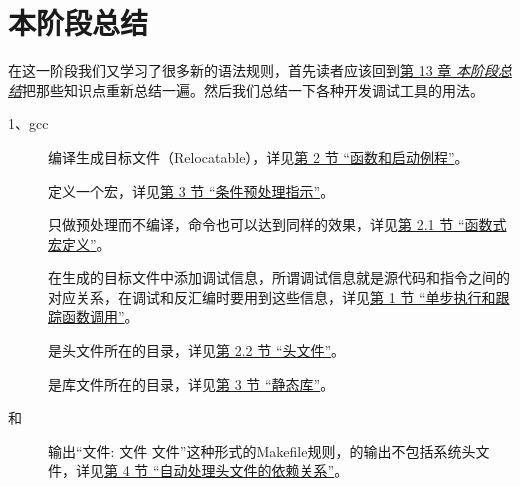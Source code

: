 

\chapter{本阶段总结}
%
在这一阶段我们又学习了很多新的语法规则，首先读者应该回到\hyperlink{db.ch13.id2752091}{第 13 章 \emph{本阶段总结}}把那些知识点重新总结一遍。然后我们总结一下各种开发调试工具的用法。



1、gcc


\begin{description}
\item[{}]


编译生成目标文件（Relocatable），详见\hyperlink{db.ch19s02.id2776173}{第 2 节 “函数和启动例程”}。

\item[{}]


定义一个宏，详见\hyperlink{db.ch21s03.id2798658}{第 3 节 “条件预处理指示”}。

\item[{}]


只做预处理而不编译，命令也可以达到同样的效果，详见\hyperlink{db.ch21s02.id2797214}{第 2.\BookSplit{}1 节 “函数式宏定义”}。

\item[{}]


在生成的目标文件中添加调试信息，所谓调试信息就是源代码和指令之间的对应关系，在调试和反汇编时要用到这些信息，详见\hyperlink{db.ch10s01.id2740199}{第 1 节 “单步执行和跟踪函数调用”}。

\item[{}]


是头文件所在的目录，详见\hyperlink{db.ch20s02.id2788051}{第 2.\BookSplit{}2 节 “头文件”}。

\item[{}]


是库文件所在的目录，详见\hyperlink{db.ch20s03.id2789183}{第 3 节 “静态库”}。

\item[{和}]


输出“文件: 文件 文件”这种形式的Makefile规则，的输出不包括系统头文件，详见\hyperlink{db.ch22s04.id2805744}{第 4 节 “自动处理头文件的依赖关系”}。


\end{description}
